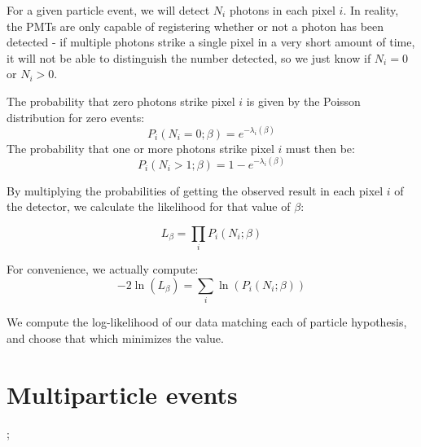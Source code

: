 For a given particle event, we will detect $N_i$ photons in each pixel $i$.
In reality, the PMTs are only capable of registering whether or not a photon has been detected - if multiple photons strike a single pixel in a very short amount of time, it will not be able to distinguish the number detected, so we just know if $N_i = 0$ or $N_i > 0$.

The probability that zero photons strike pixel $i$ is given by the Poisson distribution for zero events:
$$ P_i(N_i=0; \beta) = e^{-\lambda_i(\beta)} $$
 The probability that one or more photons strike pixel $i$ must then be:
$$ P_i(N_i>1; \beta) = 1 - e^{-\lambda_i(\beta)} $$

By multiplying the probabilities of getting the observed result in each pixel $i$ of the detector, we calculate the likelihood for that value of $\beta$:

$$L_\beta = \prod_{i}P_i(N_i; \beta)$$

For convenience, we actually compute:
\begin{equation}
    \label{eq:loglikelihood}
    -2\ln(L_\beta) = \sum_i \ln(P_i(N_i; \beta))
\end{equation}


We compute the log-likelihood of our data matching each of particle hypothesis, and choose that which minimizes the value.

\section{Multiparticle events};




\endinput

Any text after an \endinput is ignored.
You could put scraps here or things in progress.
